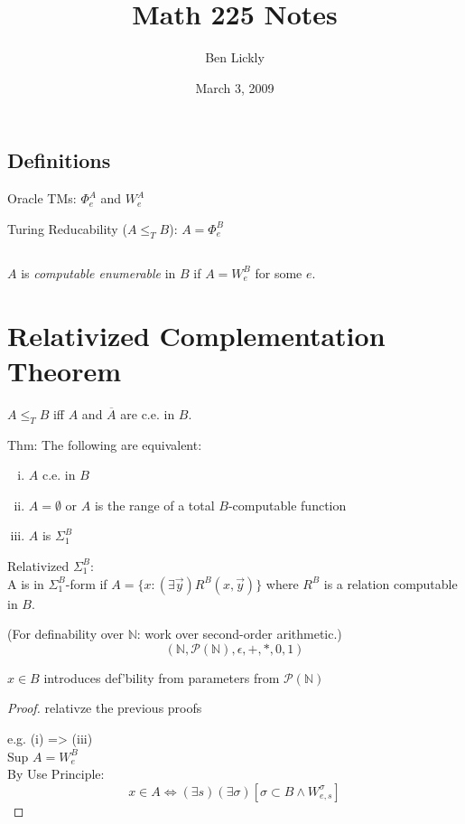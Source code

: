 \documentclass[12pt]{article}
\author{Ben Lickly}
\date{March 3, 2009}
\title{Math 225 Notes}
\newcommand{\Nat}{\ensuremath{\mathbb{N}}}
\newcommand{\Conj}[1]{\ensuremath{\overline{#1}}}
\newcommand{\Pow}[1]{\ensuremath{\mathcal{P}(#1)}}
\begin{document}
\maketitle

\subsection*{Definitions}
Oracle TMs:
$\Phi^A_e$ and $W^A_e$

Turing Reducability
($A \le_T B$):
$A = \Phi^B_e$

\subsection*{}
$A$ is \textit{computable enumerable} in $B$ if $A = W^B_e$ for some $e$.

\section*{Relativized Complementation Theorem}
 $A \le_T B$ iff $A$ and $\Conj{A}$ are c.e. in $B$.

Thm: The following are equivalent:
\begin{enumerate}[(i)]
\item $A$ c.e. in $B$
\item $A = \emptyset$ or $A$ is the range of a total $B$-computable function
\item $A$ is $\Sigma_1^B$
\end{enumerate}

Relativized $\Sigma_1^B$: \\
	A is in $\Sigma_1^B$-form if $A = \{ x : (\exists \vec{y}) R^B(x, \vec{y}) \}$
	where $R^B$ is a relation computable in $B$.

(For definability over $\Nat$: work over second-order arithmetic.)
\[ (\Nat, \Pow{\Nat},    \epsilon, +, *, 0, 1) \]

 $x 	\in 	B$
introduces def'bility from parameters from $\Pow{\Nat}$

\begin{proof}
 relativze the previous proofs

e.g. (i) => (iii) \\
Sup $A = W^B_e$ \\
By Use Principle: 
\[
 x \in A \Leftrightarrow (\exists s) (\exists \sigma) [ \sigma \subset B \wedge W_{e,s}^\sigma]
\]
\end{proof}
\end{document}

